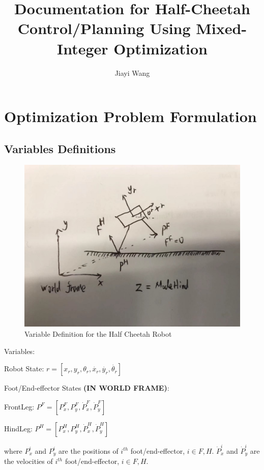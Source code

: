 \documentclass[a4paper,10pt]{article}
\title{Documentation for Half-Cheetah Control/Planning Using Mixed-Integer Optimization}
\author{Jiayi Wang}
\begin{document}
\maketitle

\section{Optimization Problem Formulation}

\subsection{Variables Definitions}

\begin{figure}[h!]
	\centering
	\includegraphics[scale = 0.3]{variable_definitions}
	\caption{Variable Definition for the Half Cheetah Robot}
	\label{fig:variable_definitions}
\end{figure}

Variables:
\vspace{2mm}

Robot State: $r = [x_r,y_r,\theta_r,\dot{x_r},\dot{y_r},\dot{\theta_r}]$
\vspace{2mm}

Foot/End-effector States \textbf{(IN WORLD FRAME)}: 

FrontLeg: $P^F=[P^F_x,P^F_y,\dot{P}^F_x,\dot{P}^F_y]$

HindLeg: $P^H=[P^H_x,P^H_y,\dot{P}^H_x,\dot{P}^H_y]$
\vspace{2mm}

where $P^i_x$ and $P^i_y$ are the positions of $i^{th}$ foot/end-effector, $i \in F, H$.
$\dot{P}^i_x$ and $\dot{P}^i_y$ are the velocities of $i^{th}$ foot/end-effector, $i \in F, H$.
\end{document}
